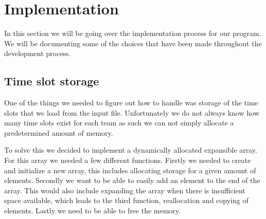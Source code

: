 \section{Implementation}
In this section we will be going over the implementation process for our program. We will be documenting some of the choices that have been made throughout the development process.

\subsection{Time slot storage}
One of the things we needed to figure out how to handle was storage of the time slots that we load from the input file. Unfortunately we do not always know how many time slots exist for each team as such we can not simply allocate a predetermined amount of memory.

To solve this we decided to implement a dynamically allocated expansible array. For this array we needed a few different functions. Firstly we needed to create and initialize a new array, this includes allocating storage for a given amount of elements. Secondly we want to be able to easily add an element to the end of the array. This would also include expanding the array when there is insufficient space available, which leads to the third function, reallocation and copying of elements. Lastly we need to be able to free the memory.

